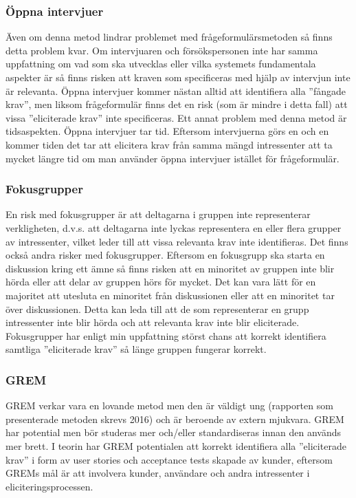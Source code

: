 \subsubsection{Öppna intervjuer}
Även om denna metod lindrar problemet med frågeformulärsmetoden så finns detta problem kvar. Om intervjuaren och försökspersonen inte har samma uppfattning om vad som ska utvecklas eller vilka systemets fundamentala aspekter är så finns risken att kraven som specificeras med hjälp av intervjun inte är relevanta. Öppna intervjuer kommer nästan alltid att identifiera alla ”fångade krav”, men liksom frågeformulär finns det en risk (som är mindre i detta fall) att vissa ”eliciterade krav” inte specificeras. Ett annat problem med denna metod är tidsaspekten. Öppna intervjuer tar tid. Eftersom intervjuerna görs en och en kommer tiden det tar att elicitera krav från samma mängd intressenter att ta mycket längre tid om man använder öppna intervjuer istället för frågeformulär.  

\subsubsection{Fokusgrupper}
En risk med fokusgrupper är att deltagarna i gruppen inte representerar verkligheten, d.v.s. att deltagarna inte lyckas representera en eller flera grupper av intressenter, vilket leder till att vissa relevanta krav inte identifieras. Det finns också andra risker med fokusgrupper. Eftersom en fokusgrupp ska starta en diskussion kring ett ämne så finns risken att en minoritet av gruppen inte blir hörda eller att delar av gruppen hörs för mycket. Det kan vara lätt för en majoritet att utesluta en minoritet från diskussionen eller att en minoritet tar över diskussionen. Detta kan leda till att de som representerar en grupp intressenter inte blir hörda och att relevanta krav inte blir eliciterade. Fokusgrupper har enligt min uppfattning störst chans att korrekt identifiera samtliga ”eliciterade krav” så länge gruppen fungerar korrekt.

\subsubsection{GREM}
GREM verkar vara en lovande metod men den är väldigt ung (rapporten som presenterade metoden skrevs 2016) och är beroende av extern mjukvara. GREM har potential men bör studeras mer och/eller standardiseras innan den används mer brett. I teorin har GREM potentialen att korrekt identifiera alla ”eliciterade krav” i form av user stories och acceptance tests skapade av kunder, eftersom GREMs mål är att involvera kunder, användare och andra intressenter i eliciteringsprocessen.

